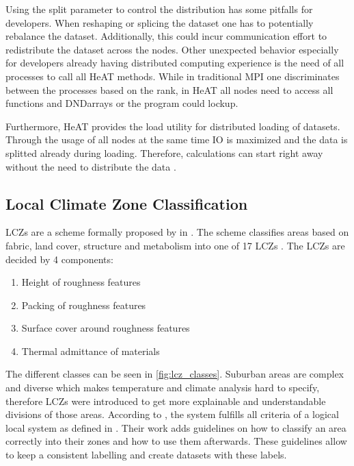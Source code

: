 Using the split parameter to control the distribution has some pitfalls for developers.
When reshaping or splicing the dataset one has to potentially rebalance the dataset. Additionally, this could incur communication effort
to redistribute the dataset across the nodes.
Other unexpected behavior especially for developers already having distributed computing experience is the need of all processes to call all \gls{HeAT} methods.
While in traditional \gls{MPI} one discriminates between the processes based on the rank, in \gls{HeAT} all nodes need to access all functions and \glspl{DNDarray} or the
program could lockup.

Furthermore, \gls{HeAT} provides the load utility for distributed loading of datasets. Through the usage of all nodes at the same time \gls{IO} is maximized and the data
is splitted already during loading. Therefore, calculations can start right away without the need to distribute the data
\cite{krajsek_helmholtz_nodate}.


\subsection{Local Climate Zone Classification}
\label{subsec:local_climate_zone_classification}

\glspl{LCZ} are a scheme formally proposed by \citeauthor{stewart_local_2012} in \cite{stewart_local_2012}. The scheme classifies areas based on fabric, land cover, structure
and metabolism into one of 17 \gls{LCZ}s \cite{xue_applications_2020}.
The \gls{LCZ}s are decided by 4 components:
\begin{enumerate}
  \item Height of roughness features
  \item Packing of roughness features
  \item Surface cover around roughness features
  \item Thermal admittance of materials
\end{enumerate}
The different classes can be seen in \cref{fig:lcz_classes}.
Suburban areas are complex and diverse which makes temperature and climate analysis hard to specify, therefore
\glspl{LCZ} were introduced to get more explainable and understandable divisions of those areas.
According to \citeauthor{stewart_local_2012}, the system fulfills all criteria of a logical local system as defined in \cite{grigg_logic_1965}.
Their work adds guidelines on how to classify an area correctly into their zones and how to use them afterwards.
These guidelines allow to keep a consistent labelling and create datasets with these labels.


